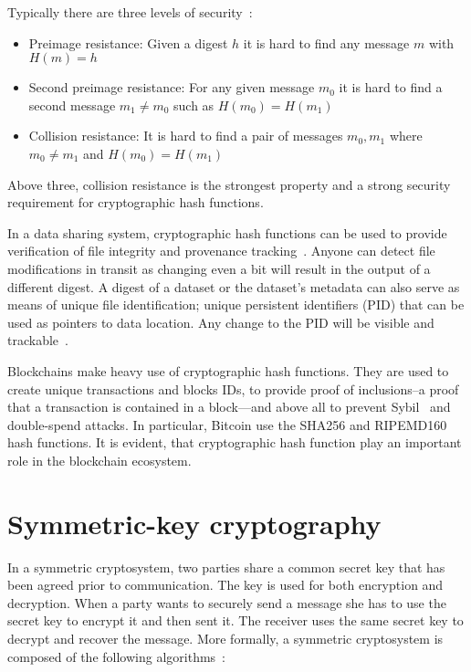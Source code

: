 Typically there are three levels of security~\cite{Katz:2014:IMC:2700550}:

\begin{itemize}
  \item Preimage resistance: Given a digest $h$ it is hard to find any message $m$ with $H(m) = h$
  \item Second preimage resistance: For any given message $m_0$ it is hard to find a second message $m_1 \neq m_0$ such as $H(m_0) = H(m_1)$
  \item Collision resistance: It is hard to find a pair of messages $m_0, m_1$ where $m_0 \neq m_1$ and $H(m_0) = H(m_1)$
\end{itemize}

Above three, collision resistance is the strongest property and a strong security requirement for cryptographic hash functions.

In a data sharing system, cryptographic hash functions can be used to provide verification of file integrity and provenance tracking~\cite{10.1109/SPW.2015.27, Azaria2016}. Anyone can detect file modifications in transit as changing even a bit will result in the output of a different digest. A digest of a dataset or the dataset's metadata can also serve as means of unique file identification; unique persistent identifiers (PID) that can be used as pointers to data location. Any change to the PID will be visible and trackable~\cite{dist_pid}.

Blockchains make heavy use of cryptographic hash functions. They are used to create unique transactions and blocks IDs, to provide proof of inclusions--a proof that a transaction is contained in a block---and above all to prevent Sybil~\cite{sybil_attack} and double-spend attacks. In particular, Bitcoin use the SHA256 and RIPEMD160 hash functions. It is evident, that cryptographic hash function play an important role in the blockchain ecosystem.

\section{Symmetric-key cryptography}
\label{preliminaries:sym}

In a symmetric cryptosystem, two parties share a common secret key that has been agreed prior to communication. The key is used for both encryption and decryption. When a party wants to securely send a message she has to use the secret key to encrypt it and then sent it. The receiver uses the same secret key to decrypt and recover the message. More formally, a symmetric cryptosystem is composed of the following algorithms~\cite{Katz:2014:IMC:2700550, kiagias:crypto}:


